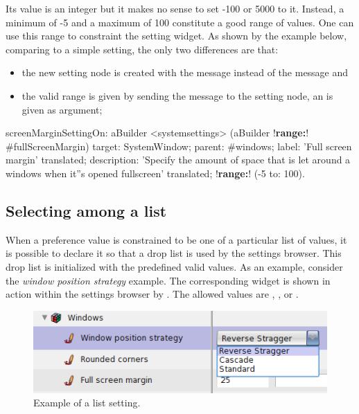 \documentclass[a4paper,10pt,twoside]{book}
\begin{document}
Its value is an integer but it makes no sense to set -100 or 5000 to it. 
Instead, a minimum of -5 and a maximum of 100 constitute a good range of values. One can use this range to constraint the setting widget. As shown by the example below, comparing to a simple setting, the only two differences are that:
\begin{itemize}
\item 
	the new setting node is created with the  message instead of the  message and
\item	the valid range is given by sending the  message to the  setting node, an  is given as argument;
\end{itemize}

\begin{code}{}
screenMarginSettingOn: aBuilder
	<systemsettings>
	(aBuilder !\textbf{range:}! #fullScreenMargin)
		target: SystemWindow;
		parent: #windows;
		label: 'Full screen margin' translated;
		description: 'Specify the amount of space that is let around a windows when it''s opened fullscreen' translated;
		!\textbf{range:}! (-5 to: 100).
\end{code}

\subsection{Selecting among a list}
When a preference value is constrained to be one of a particular list of values, it is possible to declare it so that a drop list is used by the settings browser. This drop list is initialized with the predefined valid values. As an example, consider the \textit{window position strategy} example. The corresponding widget is shown in action within the settings browser by . The allowed values are , , or .

\begin{figure}[tbh]
\begin{center}
\includegraphics[scale=0.38]{window-position-strategy}
\caption{Example of a list setting.}
\end{center}
\end{figure}
\end{document}

